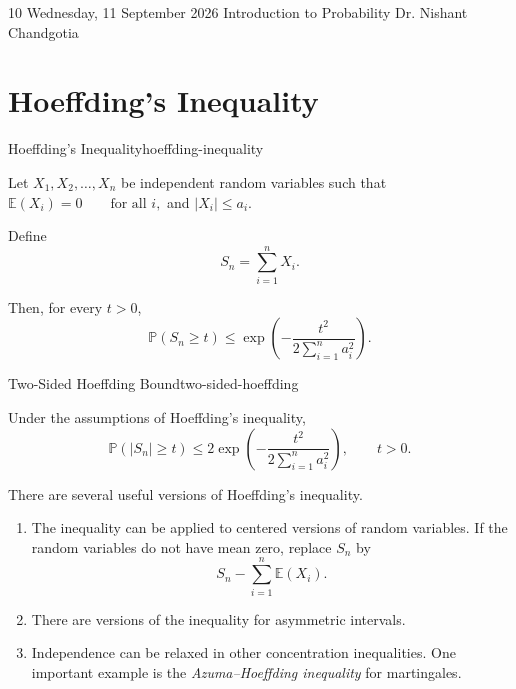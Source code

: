 
\lecture
{10}
{Wednesday, 11 September 2026}
{Introduction to Probability}
{Dr. Nishant Chandgotia}


\section{Hoeffding's Inequality}

\begin{theorem}{Hoeffding's Inequality}{hoeffding-inequality}

Let $X_1,X_2,\ldots,X_n$ be independent random variables such that
\(
    \mathbb{E}(X_i)=0
    \qquad\text{for all }i,
\)
and
\(
    |X_i|\leq a_i.
\)

Define
\[
    S_n=\sum_{i=1}^{n}X_i.
\]

Then, for every $t>0$,
\[
    \mathbb{P}(S_n\geq t)
    \leq
    \exp\left(
        -\frac{t^2}
        {2\sum_{i=1}^{n}a_i^2}
    \right).
\]

\end{theorem}

\begin{corollary}{Two-Sided Hoeffding Bound}{two-sided-hoeffding}

Under the assumptions of Hoeffding's inequality,
\[
    \mathbb{P}(|S_n|\geq t)
    \leq
    2\exp\left(
        -\frac{t^2}
        {2\sum_{i=1}^{n}a_i^2}
    \right),
    \qquad t>0.
\]

\end{corollary}

\begin{remark}

There are several useful versions of Hoeffding's inequality.

\begin{enumerate}

    \item The inequality can be applied to centered versions of
    random variables. If the random variables do not have mean zero,
    replace $S_n$ by
    \[
        S_n-\sum_{i=1}^{n}\mathbb{E}(X_i).
    \]

    \item There are versions of the inequality for asymmetric
    intervals.

    \item Independence can be relaxed in other concentration
    inequalities. One important example is the
    \emph{Azuma--Hoeffding inequality} for martingales.

\end{enumerate}

\end{remark}

